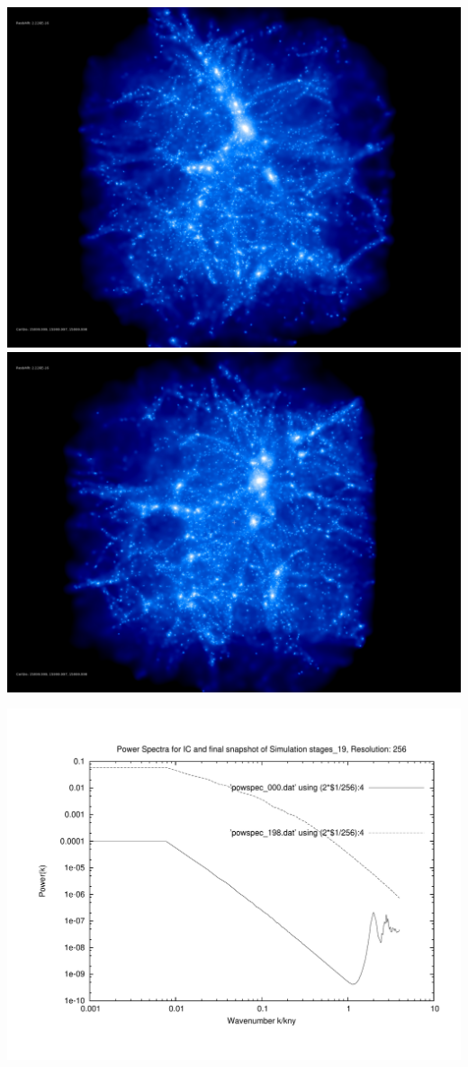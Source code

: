 \includegraphics[scale=0.1]{r256/stages_19/rotate_00074.jpg} 
\includegraphics[scale=0.1]{r256/stages_19/rotate_00131.jpg}

\includegraphics[scale=0.5]{r256/stages_19/plot_powspec_stages_19}

